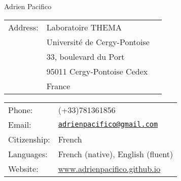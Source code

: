 \documentclass[a4paper,11pt]{article} %
\begin{document}




\vspace{1.5cm}

\begin{center}

{\LARGE Adrien Pacifico} \\





\medskip



\end{center}


\vspace{0.25in}

\begin{minipage}{0.50\linewidth}
\begin{tabular}{lll}
 Address: & Laboratoire THEMA\\
 & Université de Cergy-Pontoise\\
 & 33, boulevard du Port\\
&95011 Cergy-Pontoise Cedex\\
&France\\


\end{tabular}


\end{minipage}
\begin{minipage}{0.50\linewidth}
  \begin{tabular}{ll}
    Phone: & (+33)781361856 \\
    Email: & \href{mailto:adrienpacifico@gmail.com}{\tt adrienpacifico@gmail.com} \\
     Citizenship: & French \\
     Languages:&French (native), English (fluent)\\ 
     Website: &\url{www.adrienpacifico.github.io}

  \end{tabular}
\end{minipage}
\vspace{0.3cm}
\end{document}
